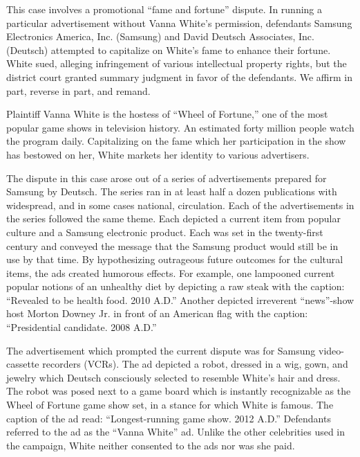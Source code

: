 

This case involves a promotional ``fame and fortune'' dispute. In running a
particular advertisement without Vanna White's permission, defendants Samsung
Electronics America, Inc. (Samsung) and David Deutsch Associates, Inc.
(Deutsch) attempted to capitalize on White's fame to enhance their fortune.
White sued, alleging infringement of various intellectual property rights, but
the district court granted summary judgment in favor of the defendants. We
affirm in part, reverse in part, and remand.

Plaintiff Vanna White is the hostess of ``Wheel of Fortune,'' one of the most
popular game shows in television history. An estimated forty million people
watch the program daily. Capitalizing on the fame which her participation in
the show has bestowed on her, White markets her identity to various
advertisers.

The dispute in this case arose out of a series of advertisements prepared for
Samsung by Deutsch. The series ran in at least half a dozen publications with
widespread, and in some cases national, circulation. Each of the advertisements
in the series followed the same theme. Each depicted a current item from
popular culture and a Samsung electronic product. Each was set in the
twenty-first century and conveyed the message that the Samsung product would
still be in use by that time. By hypothesizing outrageous future outcomes for
the cultural items, the ads created humorous effects. For example, one
lampooned current popular notions of an unhealthy diet by depicting a raw steak
with the caption: ``Revealed to be health food. 2010 A.D.'' Another depicted
irreverent ``news''-show host Morton Downey Jr. in front of an American flag
with the caption: ``Presidential candidate. 2008 A.D.''


The advertisement which prompted the current dispute was for Samsung
video-cassette recorders (VCRs). The ad depicted a robot, dressed in a wig,
gown, and jewelry which Deutsch consciously selected to resemble White's hair
and dress. The robot was posed next to a game board which is instantly
recognizable as the Wheel of Fortune game show set, in a stance for which White
is famous. The caption of the ad read: ``Longest-running game show. 2012 A.D.''
Defendants referred to the ad as the ``Vanna White'' ad. Unlike the other
celebrities used in the campaign, White neither consented to the ads nor was
she paid.

